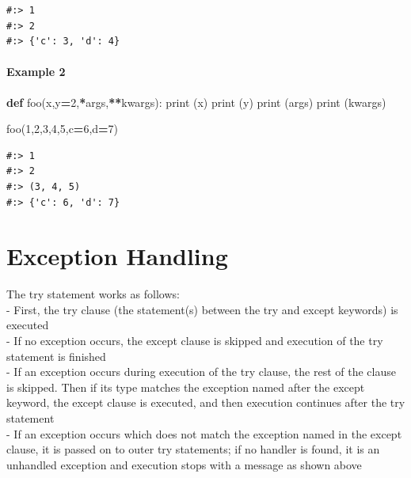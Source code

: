 \documentclass[
]{book}
\newenvironment{Shaded}{\begin{snugshade}}{\end{snugshade}}
\newcommand{\BuiltInTok}[1]{#1}
\newcommand{\DecValTok}[1]{\textcolor[rgb]{0.06,0.06,0.06}{#1}}
\newcommand{\KeywordTok}[1]{\textcolor[rgb]{0.27,0.27,0.27}{\textbf{#1}}}
\newcommand{\NormalTok}[1]{#1}
\newcommand{\OperatorTok}[1]{\textcolor[rgb]{0.43,0.43,0.43}{\textbf{#1}}}
\begin{document}
\begin{verbatim}
#:> 1
#:> 2
#:> {'c': 3, 'd': 4}
\end{verbatim}

\hypertarget{example-2-2}{%
\subsubsection{Example 2}\label{example-2-2}}

\begin{Shaded}
\begin{Highlighting}[]
\KeywordTok{def}\NormalTok{ foo(x,y}\OperatorTok{=}\DecValTok{2}\NormalTok{,}\OperatorTok{*}\NormalTok{args,}\OperatorTok{**}\NormalTok{kwargs):}
    \BuiltInTok{print}\NormalTok{ (x)}
    \BuiltInTok{print}\NormalTok{ (y)}
    \BuiltInTok{print}\NormalTok{ (args)}
    \BuiltInTok{print}\NormalTok{ (kwargs)}
    
\NormalTok{foo(}\DecValTok{1}\NormalTok{,}\DecValTok{2}\NormalTok{,}\DecValTok{3}\NormalTok{,}\DecValTok{4}\NormalTok{,}\DecValTok{5}\NormalTok{,c}\OperatorTok{=}\DecValTok{6}\NormalTok{,d}\OperatorTok{=}\DecValTok{7}\NormalTok{)}
\end{Highlighting}
\end{Shaded}

\begin{verbatim}
#:> 1
#:> 2
#:> (3, 4, 5)
#:> {'c': 6, 'd': 7}
\end{verbatim}

\hypertarget{exception-handling}{%
\chapter{Exception Handling}\label{exception-handling}}

The try statement works as follows:\\
- First, the try clause (the statement(s) between the try and except keywords) is executed\\
- If no exception occurs, the except clause is skipped and execution of the try statement is finished\\
- If an exception occurs during execution of the try clause, the rest of the clause is skipped. Then if its type matches the exception named after the except keyword, the except clause is executed, and then execution continues after the try statement\\
- If an exception occurs which does not match the exception named in the except clause, it is passed on to outer try statements; if no handler is found, it is an unhandled exception and execution stops with a message as shown above
\end{document}
